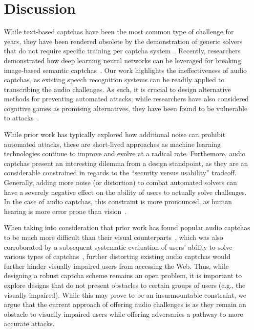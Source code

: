 \section{Discussion}
\label{sec:discussion}

While text-based captchas have been the most common type of challenge for years, they have been rendered
obsolete by the demonstration of generic solvers that do not require specific training per captcha system~\cite{185128}.
Recently, researchers demonstrated how deep learning neural networks can be leveraged for breaking image-based 
semantic captchas~\cite{sivakorn:eurosp16}. Our work highlights the ineffectiveness of audio captchas, as 
existing speech recognition systems can be readily applied to transcribing the audio challenges.
As such, it is crucial to design alternative methods for preventing automated attacks; while researchers 
have also considered cognitive games as promising alternatives, they have been found to be vulnerable to 
attacks~\cite{mohamed2017security}.

While prior work has typically explored how additional noise can prohibit automated attacks, these are 
short-lived approaches as machine learning technologies continue to improve and evolve at a radical rate.
Furthemore, audio captchas present an interesting dilemma from a design standpoint, as they are an considerable 
constrained in regards to the ``security versus usability'' tradeoff. Generally, adding more noise (or distortion) 
to combat automated solvers can have a severely negative effect on the ability of users to actually solve challenges.
In the case of audio captchas, this constraint is more pronounced, as human hearing is more error prone than 
vision~\cite{o2009auditory,shinn2008object}.

When taking into consideration that prior work has found popular audio captchas to be much more difficult 
than their visual counterparts~\cite{bigham2009evaluating}, which was also corroborated by a subsequent 
systematic evaluation of users' ability to solve various types of captchas~\cite{captchas-are-hard}, further
distorting existing audio captchas would further hinder visually impaired users from accessing the Web.
Thus, while designing a robust captcha scheme remains an open problem, it is important 
to explore designs that do not present obstacles to certain groups of users (e.g., the visually impaired). 
While this may prove to be an insurmountable constraint, we argue that the current approach of offering audio
challenges is  as they remain an obstacle to visually impaired users while offering 
adversaries a pathway to more accurate attacks.
